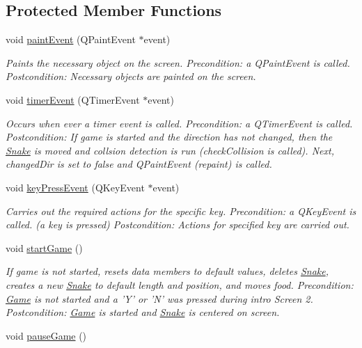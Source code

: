 \subsection*{\-Protected \-Member \-Functions}
\begin{DoxyCompactItemize}
\item 
void \hyperlink{classGame_a5c408cb3451b941a5d86757096086f95}{paint\-Event} (\-Q\-Paint\-Event $\ast$event)
\begin{DoxyCompactList}\small\item\em \-Paints the necessary object on the screen. \-Precondition\-: a \-Q\-Paint\-Event is called. \-Postcondition\-: \-Necessary objects are painted on the screen. \end{DoxyCompactList}\item 
void \hyperlink{classGame_a6a870e7567a5d57e4060d8140644a01b}{timer\-Event} (\-Q\-Timer\-Event $\ast$event)
\begin{DoxyCompactList}\small\item\em \-Occurs when ever a timer event is called. \-Precondition\-: a \-Q\-Timer\-Event is called. \-Postcondition\-: \-If game is started and the direction has not changed, then the \hyperlink{classSnake}{\-Snake} is moved and collsion detection is run (check\-Collision is called). \-Next, changed\-Dir is set to false and \-Q\-Paint\-Event (repaint) is called. \end{DoxyCompactList}\item 
void \hyperlink{classGame_a08d72c91a6daedc8fa48194253f5e567}{key\-Press\-Event} (\-Q\-Key\-Event $\ast$event)
\begin{DoxyCompactList}\small\item\em \-Carries out the required actions for the specific key. \-Precondition\-: a \-Q\-Key\-Event is called. (a key is pressed) \-Postcondition\-: \-Actions for specified key are carried out. \end{DoxyCompactList}\item 
\hypertarget{classGame_ae8638ccdb0ef3bf39a6affa30aa1258f}{void \hyperlink{classGame_ae8638ccdb0ef3bf39a6affa30aa1258f}{start\-Game} ()}\label{classGame_ae8638ccdb0ef3bf39a6affa30aa1258f}

\begin{DoxyCompactList}\small\item\em \-If game is not started, resets data members to default values, deletes \hyperlink{classSnake}{\-Snake}, creates a new \hyperlink{classSnake}{\-Snake} to default length and position, and moves food. \-Precondition\-: \hyperlink{classGame}{\-Game} is not started and a '\-Y' or '\-N' was pressed during intro \-Screen 2. \-Postcondition\-: \hyperlink{classGame}{\-Game} is started and \hyperlink{classSnake}{\-Snake} is centered on screen. \end{DoxyCompactList}\item 
\hypertarget{classGame_a9d9a79a0f7df3c7e55a3103c04ecbc87}{void \hyperlink{classGame_a9d9a79a0f7df3c7e55a3103c04ecbc87}{pause\-Game} ()}\label{classGame_a9d9a79a0f7df3c7e55a3103c04ecbc87}


\end{DoxyCompactItemize}
